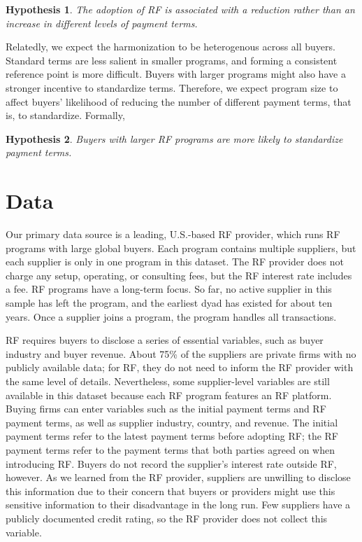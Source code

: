 \documentclass[a4paper,11pt]{article}
\renewcommand{\~}[1]{\tilde{#1}}
\renewcommand{\-}[1]{\overline{#1}}
\newtheorem{hypothesis}{Hypothesis}
\newcounter{pretheorem}
\renewcommand\thehypothesis{\arabic{pretheorem}\alph{hypothesis}}
\newcommand{\theoremgroup}{\refstepcounter{pretheorem}}
\begin{document}
\theoremgroup
\renewcommand\thehypothesis{\arabic{pretheorem}\alph{hypothesis}}
\begin{hypothesis}\label{H:reduceTerms}\singlespacing
The adoption of RF is associated with a reduction rather than an increase in different levels of payment terms.
\end{hypothesis}
Relatedly, we expect the harmonization to be heterogenous across all buyers. Standard terms are less salient in smaller programs, and forming a consistent reference point is more difficult. Buyers with larger programs might also have a stronger incentive to standardize terms. Therefore, we expect program size to affect buyers' likelihood of reducing the number of different payment terms, that is, to standardize. Formally,
\begin{hypothesis}\label{H:salience}\singlespacing
Buyers with larger RF programs are more likely to standardize payment terms.
\end{hypothesis}





\section{Data}\label{sec:data}
Our primary data source is a leading, U.S.-based RF provider, which runs RF programs with large global buyers. Each program contains multiple suppliers, but each supplier is only in one program in this dataset. The RF provider does not charge any setup, operating, or consulting fees, but the RF interest rate includes a fee. RF programs have a long-term focus. So far, no active supplier in this sample has left the program, and the earliest dyad has existed for about ten years. Once a supplier joins a program, the program handles all transactions.

RF requires buyers to disclose a series of essential variables, such as buyer industry and buyer revenue. About 75\% of the suppliers are private firms with no publicly available data; for RF, they do not need to inform the RF provider with the same level of details. Nevertheless, some supplier-level variables are still available in this dataset because each RF program features an RF platform. Buying firms can enter variables such as the initial payment terms and RF payment terms, as well as supplier industry, country, and revenue. The initial payment terms refer to the latest payment terms before adopting RF; the RF payment terms refer to the payment terms that both parties agreed on when introducing RF. Buyers do not record the supplier's interest rate outside RF, however. As we learned from the RF provider, suppliers are unwilling to disclose this information due to their concern that buyers or providers might use this sensitive information to their disadvantage in the long run. Few suppliers have a publicly documented credit rating, so the RF provider does not collect this variable.
\end{document}
